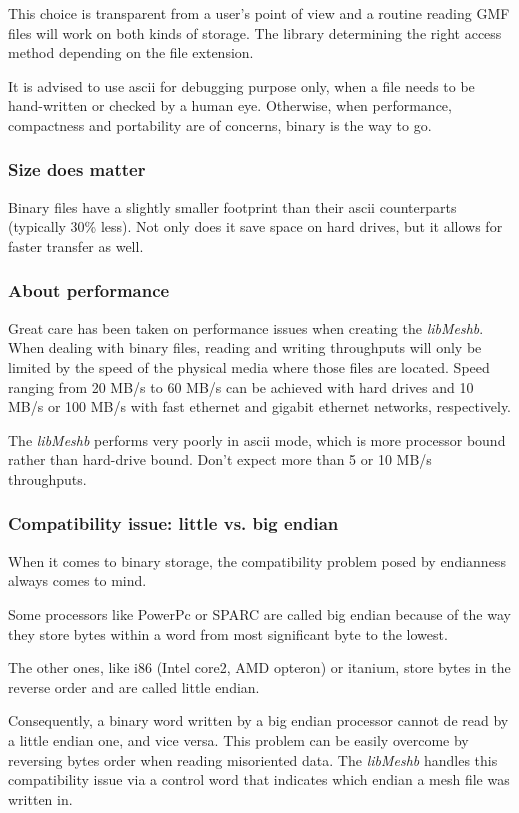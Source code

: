 \documentclass[a4paper,12pt]{article}
\begin{document}
This choice is transparent from a user's point of view and a routine reading GMF files will work on both kinds of storage.
The library determining the right access method depending on the file extension.

It is advised to use ascii for debugging purpose only, when a file needs to be hand-written or checked by a human eye. Otherwise, when performance, compactness and portability are of concerns, binary is the way to go.


\subsubsection{Size does matter}
Binary files have a slightly smaller footprint than their ascii counterparts (typically 30\% less). Not only does it save space on hard drives, but it allows for faster transfer as well.


\subsubsection{About performance}
Great care has been taken on performance issues when creating the \emph{libMeshb}. When dealing with binary files, reading and writing throughputs will only be limited by the speed of the physical media where those files are located. Speed ranging from 20 MB/s to 60 MB/s can be achieved with hard drives and 10 MB/s or 100 MB/s with fast ethernet and gigabit ethernet networks, respectively.

The \emph{libMeshb} performs very poorly in ascii mode, which is more processor bound rather than hard-drive bound. Don't expect more than 5 or 10 MB/s throughputs.

\subsubsection{Compatibility issue: little vs. big endian}
When it comes to binary storage, the compatibility problem posed by endianness always comes to mind.

Some processors like PowerPc or SPARC are called big endian because of the way they store bytes within a word from most significant byte to the lowest.

The other ones, like i86 (Intel core2, AMD opteron) or itanium, store bytes in the reverse order and are called little endian.

Consequently, a binary word written by a big endian processor cannot de read by a little endian one, and vice versa. This problem can be easily overcome by reversing bytes order when reading misoriented data. The \emph{libMeshb} handles this compatibility issue via a control word that indicates which endian a mesh file was written in.
\end{document}
